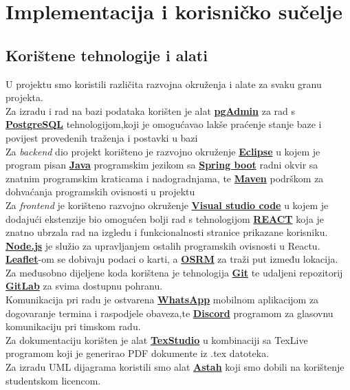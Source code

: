 \chapter{Implementacija i korisničko sučelje}
		
		
		\section{Korištene tehnologije i alati}
		

			
			 	{U projektu smo koristili različita razvojna okruženja i alate za svaku granu projekta.\\
			 	Za izradu i rad na bazi podataka korišten je alat \textbf{\href{https://www.pgadmin.org/}{pgAdmin}} za rad s \textbf{\href{https://www.postgresql.org/}{PostgreSQL}} tehnologijom,koji je omogućavao lakše praćenje stanje baze i povijest provedenih traženja i postavki u bazi\\
			 	Za \textit{backend} dio projekt korišteno je razvojno okruženje \textbf{\href{https://www.eclipse.org/}{Eclipse}} u kojem je program pisan \textbf{\href{https://www.java.com/en/}{Java}} programskim jezikom sa \textbf{\href{https://spring.io/projects/spring-boot}{Spring boot}} radni okvir sa znatnim programskim kraticama i nadogradnjama, te \textbf{\href{https://maven.apache.org/}{Maven}} podrškom za dohvaćanja programskih ovisnosti u projektu\\
			 	Za \textit{frontend} je korišteno razvojno okruženje \textbf{\href{https://code.visualstudio.com/}{Visual studio code}} u kojem je dodajući ekstenzije bio omogućen bolji rad s tehnologijom \textbf{\href{https://reactjs.org/}{REACT}} koja je znatno ubrzala rad na izgledu i funkcionalnosti stranice prikazane korisniku.
			 	\textbf{\href{https://nodejs.org/en/}{Node.js}} je služio za upravljanjem ostalih programskih ovisnosti u Reactu. \textbf{\href{https://leafletjs.com/}{Leaflet}}-om se dobivaju podaci o karti, a \textbf{\href{http://project-osrm.org/}{OSRM}} za traži put između lokacija.\\
			 	Za međusobno dijeljene koda korištena je tehnologija \textbf{\href{http://www.git-scm.com/}{Git}} te udaljeni repozitorij \textbf{\href{https://about.gitlab.com/}{GitLab}} za svima dostupnu pohranu.\\
			 	Komunikacija pri radu je ostvarena \textbf{\href{https://www.whatsapp.com/}{WhatsApp}} mobilnom aplikacijom za dogovaranje termina i raspodjele obaveza,te \textbf{\href{https://discord.com/}{Discord}} programom za glasovnu komunikaciju pri timskom radu.\\
			 	Za dokumentaciju korišten je alat \textbf{\href{https://tug.org/texlive/}{TexStudio}} u kombinaciji sa TexLive programom koji je generirao PDF dokumente iz .tex datoteka.\\
			 	Za izradu UML dijagrama koristili smo alat \textbf{\href{https://astah.net/}{Astah}} koji smo dobili na korištenje studentskom licencom}.
			
